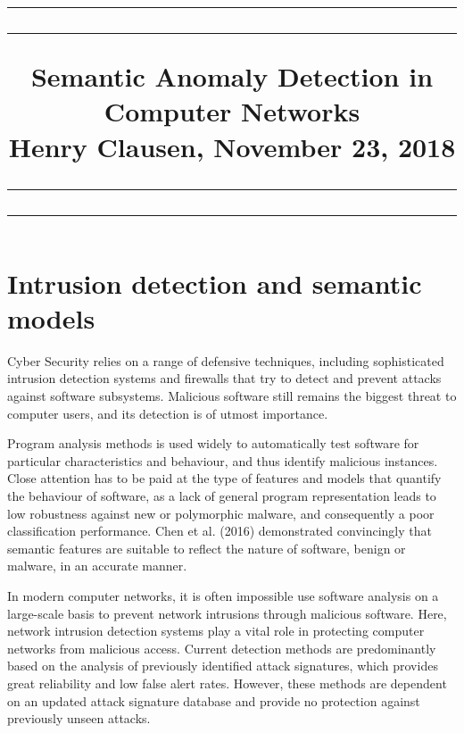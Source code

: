 \documentclass[a4paper,12pt,twoside]{article}
\begin{document}
\title{ \hrule \vspace{0.1cm} \hrule  \vspace{0.2cm} \Large{\bf Semantic Anomaly Detection in Computer Networks}\\ \large Henry Clausen, November 23, 2018 \vspace{0.1cm}
 \hrule \vspace{0.1cm} \hrule  
}

\date{}

\maketitle


\vspace{-2cm}

\section*{Intrusion detection and semantic models}

Cyber Security relies on a range of defensive techniques, including sophisticated intrusion detection systems and firewalls that try to detect and prevent attacks against software subsystems. Malicious software still remains the biggest threat to computer users, and its detection is of utmost importance. 

Program analysis methods is used widely to automatically test software for particular characteristics and behaviour, and thus identify malicious instances. Close attention has to be paid at the type of features and models that quantify the behaviour of software, as a lack of general program representation leads to low robustness against new or polymorphic malware, and consequently a poor classification performance.  Chen et al.  (2016) \cite{chen2016robust, chen2016more} demonstrated convincingly that semantic features are suitable to reflect the nature of software, benign or malware, in an accurate manner. %


In modern computer networks, it is often impossible use software analysis on a large-scale basis to prevent network intrusions through malicious software. Here, network intrusion detection systems play a vital role in protecting computer networks from malicious access. Current detection methods are predominantly based on the analysis of previously identified attack signatures, which provides great reliability and low false alert rates. However, these methods are dependent on an updated attack signature database and provide no protection against previously unseen attacks. 
\end{document}
